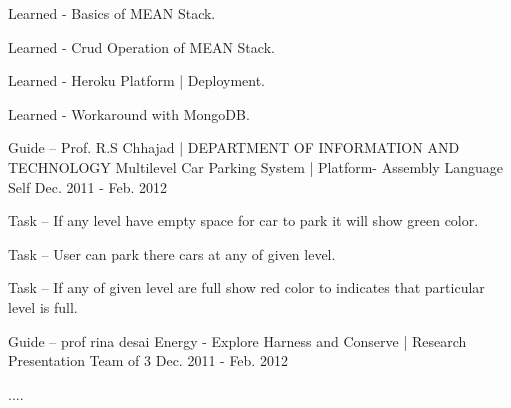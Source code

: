 \begin{cventries}
{\begin{cvitems}
                \item {Learned - Basics of MEAN Stack.}
                \item {Learned - Crud Operation of MEAN Stack.}
                \item {Learned - Heroku Platform | Deployment.}
                \item {Learned - Workaround with MongoDB.}
            \end{cvitems}
    }  
  \cventry
    {Guide – Prof. R.S Chhajad | DEPARTMENT OF INFORMATION AND TECHNOLOGY}
    {Multilevel Car Parking System | Platform- Assembly Language}
    {Self}
    {Dec. 2011 - Feb. 2012}
    {
      \begin{cvitems}
        \item {Task – If any level have empty space for car to park it will show green color. }
        \item {Task – User can park there cars at any of given level. }
        \item {Task – If any of given level are full show red color to indicates that particular level is full.}
      \end{cvitems}
    }
    \cventry
    {Guide – prof rina desai}
    {Energy - Explore Harness and Conserve | Research Presentation}
    {Team of 3}
    {Dec. 2011 - Feb. 2012}
    {
      \begin{cvitems}
        \item {....}
      \end{cvitems}
    }
\end{cventries}

